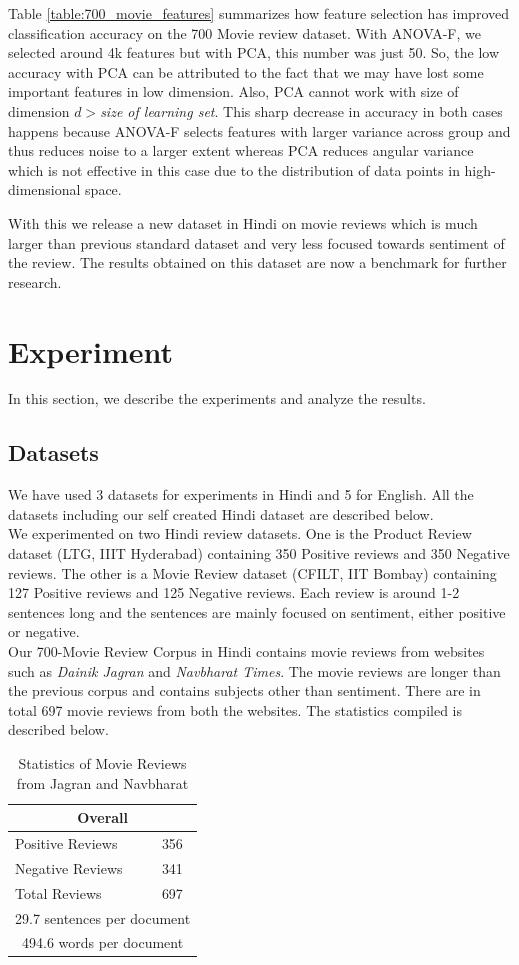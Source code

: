 \documentclass[11pt,a4paper]{article}
\begin{document}
Table \ref{table:700_movie_features} summarizes how feature selection has improved classification accuracy on the 700 Movie review dataset. With ANOVA-F, we selected around 4k features but with PCA, this number was just 50. So, the low accuracy with PCA can be attributed to the fact that we may have lost some important features in low dimension. Also, PCA cannot work with size of dimension $d>$\emph{size of learning set}. This sharp decrease in accuracy in both cases happens because ANOVA-F selects features with larger variance across group and thus reduces noise to a larger extent whereas PCA reduces angular variance which is not effective in this case due to the distribution of data points in high-dimensional space.

With this we release a new dataset in Hindi on movie reviews which is much larger than previous standard dataset and very less focused towards sentiment of the review. The results obtained on this dataset are now a benchmark for further research.

\section{Experiment}
\label{sec:experiment}
In this section, we describe the experiments and analyze the results.

\subsection{Datasets}
We have used 3 datasets for experiments in Hindi and 5 for English. All the datasets including our self created Hindi dataset are described below.\\
We experimented on two Hindi review datasets. One is the Product Review dataset (LTG, IIIT Hyderabad) containing 350 Positive reviews and 350 Negative reviews. The other is a Movie Review dataset (CFILT, IIT Bombay) containing 127 Positive reviews and 125 Negative reviews. Each review is around 1-2 sentences long and the sentences are mainly focused on sentiment, either positive or negative.\\
Our 700-Movie Review Corpus in Hindi contains movie reviews from websites such as \emph{Dainik Jagran} and \emph{Navbharat Times}. The movie reviews are longer than the previous corpus and contains subjects other than sentiment. There are in total 697 movie reviews from both the websites. The statistics compiled is described below.
\begin {table}[h!]
\centering
\begin{tabular}{ |l|l| }
\hline
\multicolumn{2}{|c|}{\textbf{Overall}} \\
\hline
Positive Reviews & 356 \\ 
Negative Reviews & 341 \\
Total Reviews & 697\\ \hline
\multicolumn{2}{|c|}{29.7 sentences per document} \\ \hline
\multicolumn{2}{|c|}{494.6 words per document} \\
\hline
\end{tabular}
\caption {Statistics of Movie Reviews from Jagran and Navbharat}
\end{table}
\end{document}
